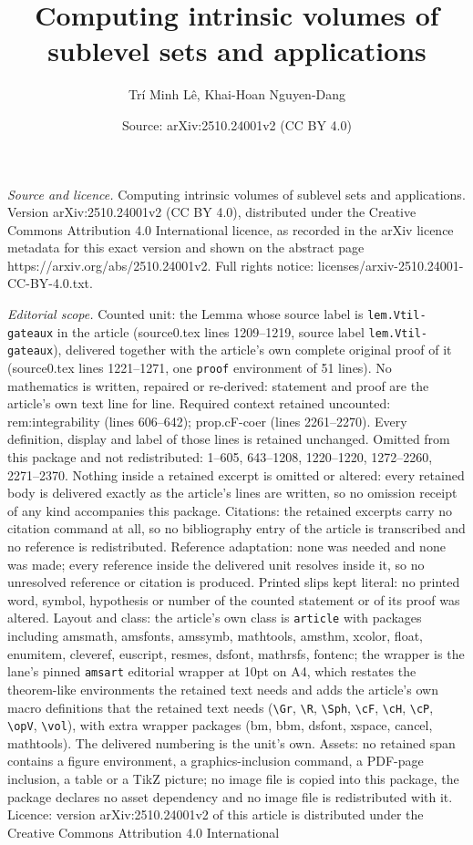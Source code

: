 \documentclass[10pt,a4paper]{amsart}
\title[Computing intrinsic volumes of sublevel sets and application]{Computing intrinsic volumes of sublevel sets and applications}
\author{Tr\'i Minh L\^e, Khai-Hoan Nguyen-Dang}
\date{Source: arXiv:2510.24001v2 (CC BY 4.0)}
\begin{document}
\maketitle

\noindent\emph{Source and licence.} Computing intrinsic volumes of sublevel sets and applications. Version arXiv:2510.24001v2 (CC BY 4.0), distributed under the Creative Commons Attribution 4.0 International licence, as recorded in the arXiv licence metadata for this exact version and shown on the abstract page https://arxiv.org/abs/2510.24001v2. Full rights notice: licenses/arxiv-2510.24001-CC-BY-4.0.txt.\par\smallskip

\noindent\textit{Editorial scope.} Counted unit: the Lemma whose source label is \texttt{lem.Vtil-gateaux} in the article (source0.tex lines 1209--1219, source label \texttt{lem.Vtil-gateaux}), delivered together with the article's own complete original proof of it (source0.tex lines 1221--1271, one \texttt{proof} environment of 51 lines). No mathematics is written, repaired or re-derived: statement and proof are the article's own text line for line. Required context retained uncounted: rem:integrability (lines 606--642); prop.cF-coer (lines 2261--2270). Every definition, display and label of those lines is retained unchanged. Omitted from this package and not redistributed: 1--605, 643--1208, 1220--1220, 1272--2260, 2271--2370. Nothing inside a retained excerpt is omitted or altered: every retained body is delivered exactly as the article's lines are written, so no omission receipt of any kind accompanies this package. Citations: the retained excerpts carry no citation command at all, so no bibliography entry of the article is transcribed and no reference is redistributed. Reference adaptation: none was needed and none was made; every reference inside the delivered unit resolves inside it, so no unresolved reference or citation is produced. Printed slips kept literal: no printed word, symbol, hypothesis or number of the counted statement or of its proof was altered. Layout and class: the article's own class is \texttt{article} with packages including amsmath, amsfonts, amssymb, mathtools, amsthm, xcolor, float, enumitem, cleveref, euscript, resmes, dsfont, mathrsfs, fontenc; the wrapper is the lane's pinned \texttt{amsart} editorial wrapper at 10pt on A4, which restates the theorem-like environments the retained text needs and adds the article's own macro definitions that the retained text needs (\texttt{\textbackslash Gr}, \texttt{\textbackslash R}, \texttt{\textbackslash Sph}, \texttt{\textbackslash cF}, \texttt{\textbackslash cH}, \texttt{\textbackslash cP}, \texttt{\textbackslash opV}, \texttt{\textbackslash vol}), with extra wrapper packages (bm, bbm, dsfont, xspace, cancel, mathtools). The delivered numbering is the unit's own. Assets: no retained span contains a figure environment, a graphics-inclusion command, a PDF-page inclusion, a table or a TikZ picture; no image file is copied into this package, the package declares no asset dependency and no image file is redistributed with it. Licence: version arXiv:2510.24001v2 of this article is distributed under the Creative Commons Attribution 4.0 International 
\end{document}
